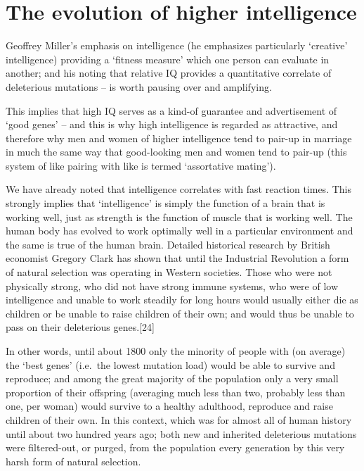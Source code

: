 \documentclass[
]{book}
\begin{document}
\hypertarget{the-evolution-of-higher-intelligence}{%
\section{The evolution of higher intelligence}\label{the-evolution-of-higher-intelligence}}

Geoffrey Miller's emphasis on intelligence (he emphasizes particularly `creative' intelligence) providing a `fitness measure' which one person can evaluate in another; and his noting that relative IQ provides a quantitative correlate of deleterious mutations -- is worth pausing over and amplifying.

This implies that high IQ serves as a kind-of guarantee and advertisement of `good genes' -- and this is why high intelligence is regarded as attractive, and therefore why men and women of higher intelligence tend to pair-up in marriage in much the same way that good-looking men and women tend to pair-up (this system of like pairing with like is termed `assortative mating').

We have already noted that intelligence correlates with fast reaction times. This strongly implies that `intelligence' is simply the function of a brain that is working well, just as strength is the function of muscle that is working well. The human body has evolved to work optimally well in a particular environment and the same is true of the human brain. Detailed historical research by British economist Gregory Clark has shown that until the Industrial Revolution a form of natural selection was operating in Western societies. Those who were not physically strong, who did not have strong immune systems, who were of low intelligence and unable to work steadily for long hours would usually either die as children or be unable to raise children of their own; and would thus be unable to pass on their deleterious genes.{[}24{]}

In other words, until about 1800 only the minority of people with (on average) the `best genes' (i.e.~the lowest mutation load) would be able to survive and reproduce; and among the great majority of the population only a very small proportion of their offspring (averaging much less than two, probably less than one, per woman) would survive to a healthy adulthood, reproduce and raise children of their own. In this context, which was for almost all of human history until about two hundred years ago; both new and inherited deleterious mutations were filtered-out, or purged, from the population every generation by this very harsh form of natural selection.
\end{document}
